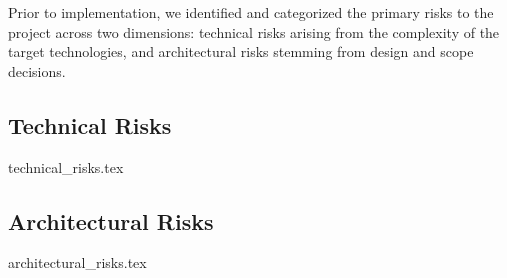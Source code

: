 Prior to implementation, we identified and categorized the primary risks to the project across two dimensions: technical risks arising from the complexity of the target technologies, and architectural risks stemming from design and scope decisions.

\subsection{Technical Risks}
\label{sec:risk_evaluation:technical}
{technical_risks.tex}

\subsection{Architectural Risks}
\label{sec:risk_evaluation:architectural}
{architectural_risks.tex}
